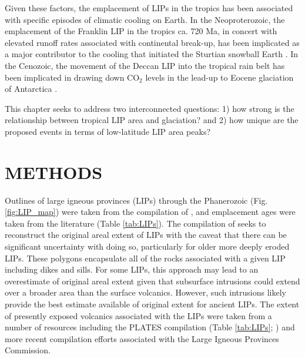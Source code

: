 \documentclass[11pt,letterpaper]{article}
\begin{document}
Given these factors, the emplacement of LIPs in the tropics has been associated with specific episodes of climatic cooling on Earth. In the Neoproterozoic, the emplacement of the Franklin LIP in the tropics ca. 720 Ma, in concert with elevated runoff rates associated with continental break-up, has been implicated as a major contributor to the cooling that initiated the Sturtian snowball Earth \citep{Donnadieu2004b, Cox2016}. In the Cenozoic, the movement of the Deccan LIP into the tropical rain belt has been implicated in drawing down CO$_2$ levels in the lead-up to Eocene glaciation of Antarctica \citep{Kent2008a}.


This chapter seeks to address two interconnected questions: 1) how strong is the relationship between tropical LIP area and glaciation? and 2) how unique are the proposed events in terms of low-latitude LIP area peaks?

\section*{METHODS}

Outlines of large igneous provinces (LIPs) through the Phanerozoic (Fig. \ref{fig:LIP_map}) were taken from the compilation of \cite{Ernst2017a}, and emplacement ages were taken from the literature (Table \ref{tab:LIPs}). The compilation of \cite{Ernst2017a} seeks to reconstruct the original areal extent of LIPs with the caveat that there can be significant uncertainty with doing so, particularly for older more deeply eroded LIPs. These polygons encapsulate all of the rocks associated with a given LIP including dikes and sills. For some LIPs, this approach may lead to an overestimate of original areal extent given that subsurface intrusions could extend over a broader area than the surface volcanics. However, such intrusions likely provide the best estimate available of original extent for ancient LIPs. The extent of presently exposed volcanics associated with the LIPs were taken from a number of resources including the PLATES compilation (Table \ref{tab:LIPs}; \citealp{Coffin2006a}) and more recent compilation efforts associated with the Large Igneous Provinces Commission. 
\end{document}

